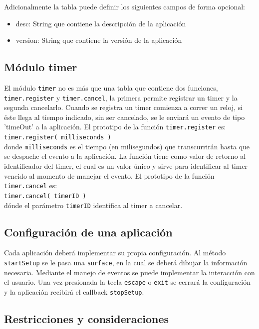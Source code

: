 Adicionalmente la tabla puede definir los siguientes campos de forma opcional:
\begin{itemize}
	\item desc: String que contiene la descripción de la aplicación
	\item version: String que contiene la versión de la aplicación
\end{itemize}

\subsection{Módulo timer}

El módulo \texttt{timer} no es más que una tabla que contiene dos funciones, \texttt{timer.register} y \texttt{timer.cancel}, la primera permite registrar un timer y la segunda cancelarlo. Cuando se registra un timer comienza a correr un reloj, si éste llega al tiempo indicado, sin ser cancelado, se le enviar\'a un evento de tipo 'timeOut' a la aplicaci\'on.
El prototipo de la función \texttt{timer.register} es:\\
\texttt{timer.register( milliseconds )}\\
donde \texttt{milliseconds} es el tiempo (en milisegundos) que transcurrir\'an hasta que se despache el evento a la aplicaci\'on. La función tiene como valor de retorno al identificador del timer, el cual es un valor único y sirve para identificar al timer vencido al momento de manejar el evento.
El prototipo de la función \texttt{timer.cancel} es:\\
\texttt{timer.cancel( timerID )}\\
dónde el parámetro \texttt{timerID} identifica al timer a cancelar.

\subsection{Configuración de una aplicación}

Cada aplicaci\'on deber\'a implementar su propia configuraci\'on. Al m\'etodo \texttt{startSetup} se le pasa una \texttt{surface}, en la cual se deber\'a dibujar la informaci\'on necesaria. Mediante el manejo de eventos se puede implementar la interacci\'on con el usuario. Una vez presionada la tecla \texttt{escape} o \texttt{exit} se cerrar\'a la configuración y la aplicación recibirá el callback \texttt{stopSetup}.

\subsection{Restricciones y consideraciones}

